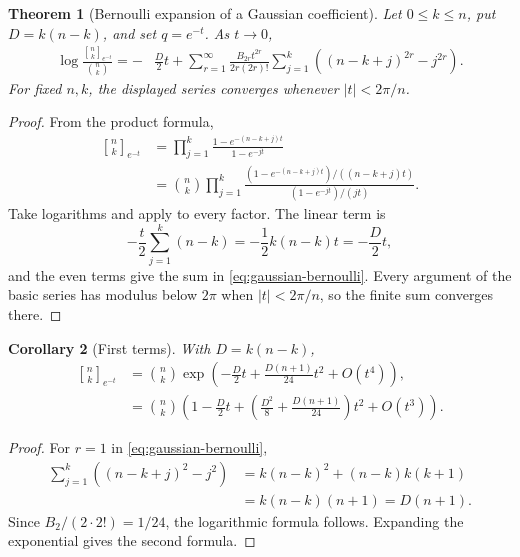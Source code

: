\documentclass[11pt,oneside,openany]{book}
\newtheorem{theorem}{Theorem}[chapter]
\newtheorem{corollary}[theorem]{Corollary}
\theoremstyle{definition}
\theoremstyle{remark}
\newcommand{\Qbinom}[3]{\genfrac{[}{]}{0pt}{}{#1}{#2}_{#3}}
\newcommand{\abs}[1]{\lvert #1\rvert}
\begin{document}
\begin{theorem}[Bernoulli expansion of a Gaussian coefficient]\label{thm:gaussian-bernoulli}
Let $0\le k\le n$, put $D=k(n-k)$, and set $q=e^{-t}$.  As $t\to0$,
\begin{align}
 \log\frac{\Qbinom nk{e^{-t}}}{\binom nk}
 =-&\frac D2t
 +\sum_{r=1}^{\infty}
 \frac{B_{2r}t^{2r}}{2r(2r)!}
 \sum_{j=1}^{k}
 \left((n-k+j)^{2r}-j^{2r}\right).
 \tag{19.2}\label{eq:gaussian-bernoulli}
\end{align}
For fixed $n,k$, the displayed series converges whenever $\abs t<2\pi/n$.
\end{theorem}

\begin{proof}
From the product formula,
\begin{align*}
 \Qbinom nk{e^{-t}}
 &=\prod_{j=1}^{k}
 \frac{1-e^{-(n-k+j)t}}{1-e^{-jt}}\\
 &=\binom nk
 \prod_{j=1}^{k}
 \frac{(1-e^{-(n-k+j)t})/((n-k+j)t)}
      {(1-e^{-jt})/(jt)}.
\end{align*}
Take logarithms and apply  to every factor.  The linear term is
\[
 -\frac t2\sum_{j=1}^{k}(n-k)=-\frac12k(n-k)t=-\frac D2t,
\]
and the even terms give the sum in \eqref{eq:gaussian-bernoulli}.  Every argument of the basic series has modulus below $2\pi$ when $\abs t<2\pi/n$, so the finite sum converges there.
\end{proof}

\begin{corollary}[First terms]\label{cor:gaussian-first-asymptotic}
With $D=k(n-k)$,
\begin{align}
 \Qbinom nk{e^{-t}}
 &=\binom nk
 \exp\left(
 -\frac D2t+\frac{D(n+1)}{24}t^2+O(t^4)
 \right),
 \tag{19.3}\label{eq:gaussian-first-asymptotic}\\
 &=\binom nk\left(
 1-\frac D2t+
 \left(\frac{D^2}{8}+\frac{D(n+1)}{24}\right)t^2
 +O(t^3)
 \right).
 \tag{19.4}\label{eq:gaussian-first-expanded}
\end{align}
\end{corollary}

\begin{proof}
For $r=1$ in \eqref{eq:gaussian-bernoulli},
\begin{align*}
 \sum_{j=1}^{k}\left((n-k+j)^2-j^2\right)
 &=k(n-k)^2+(n-k)k(k+1)\\
 &=k(n-k)(n+1)=D(n+1).
\end{align*}
Since $B_2/(2\cdot2!)=1/24$, the logarithmic formula follows.  Expanding the exponential gives the second formula.
\end{proof}
\end{document}
